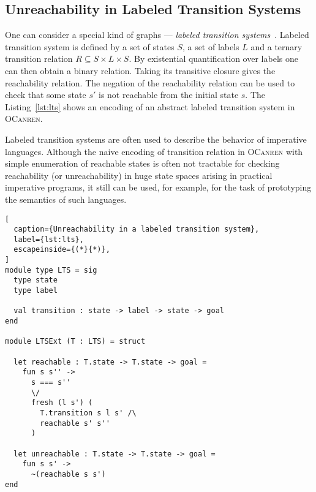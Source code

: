 \subsection{Unreachability in Labeled Transition Systems}

One can consider a special kind of graphs --- 
\emph{labeled transition systems}~\cite{baier2008principles}.
Labeled transition system is defined by a set of states $S$,
a set of labels $L$ and a ternary transition relation $R \subseteq S \times L \times S$.
By existential quantification over labels one can then obtain a binary relation. 
Taking its transitive closure gives the reachability relation.
The negation of the reachability relation can be used 
to check that some state $s'$ is not reachable from the initial state $s$.
The Listing~\ref{lst:lts} shows an encoding of an
abstract labeled transition system in \textsc{OCanren}.

Labeled transition systems are often used to 
describe the behavior of imperative languages.
Although the naive encoding of transition relation in \textsc{OCanren}
with simple enumeration of reachable states is often
not tractable for checking reachability (or unreachability) in 
huge state spaces arising in practical imperative programs,
it still can be used, for example, for the task of 
prototyping the semantics of such languages.

\begin{minipage}[htp]{\textwidth}
\begin{lstlisting}[
  caption={Unreachability in a labeled transition system},
  label={lst:lts},
  escapeinside={(*}{*)},
]
module type LTS = sig
  type state
  type label

  val transition : state -> label -> state -> goal
end

module LTSExt (T : LTS) = struct

  let reachable : T.state -> T.state -> goal = 
    fun s s'' -> 
      s === s'' 
      \/
      fresh (l s') (
        T.transition s l s' /\
        reachable s' s''
      )

  let unreachable : T.state -> T.state -> goal = 
    fun s s' -> 
      ~(reachable s s')
end

\end{lstlisting}
\end{minipage}
